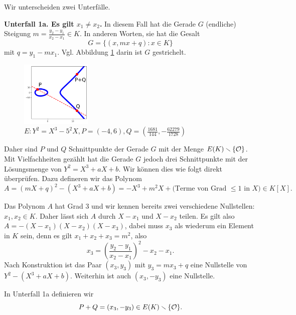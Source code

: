 Wir unterscheiden zwei Unterfälle. 

\textbf{Unterfall 1a. Es gilt $x_1\not=x_2$.} In diesem Fall hat die
Gerade $G$ (endliche) Steigung $m = \frac{y_2-y_1}{x_2-x_1}\in K$. In
anderen Worten, sie hat die Gesalt
\begin{equation*}
  G = \{(x,mx+q) : x\in K \}
\end{equation*}
mit $q=y_1-m x_1$. Vgl. Abbildung \ref{fig:unterfall1a} darin ist $G$
gestrichelt.

\begin{figure}
  \centering    
  \caption{$E: Y^2 = X^3-5^2 X,P = (-4,6),Q = (\frac{1681}{144},-\frac{62279}{1728})$}
  \label{fig:unterfall1a}
  \includegraphics[width=0.3\textwidth]{./plots/unterfall1a.png}
\end{figure}
 
Daher sind $P$ und $Q$ Schnittpunkte der Gerade $G$ mit der Menge
$E(K)\smallsetminus \{{\mathcal O}\}$. Mit Vielfachheiten gezählt hat die Gerade $G$
jedoch drei Schnittpunkte mit der Lösungsmenge von $Y^2=X^3+aX+b$. Wir
können dies wie folgt direkt überprüfen. Dazu defineren wir
das Polynom
\begin{equation*}
  A = (mX+q)^2 - (X^3+aX+b) =-X^3+m^2X +\text{(Terme von Grad $\le 1$ in $X$)}
  \in K[X]. 
\end{equation*}

Das Polynom $A$ hat Grad $3$  und wir kennen bereits zwei verschiedene
Nullstellen: $x_1,x_2\in K$. Daher lässt sich $A$ durch $X-x_1$ und
$X-x_2$ teilen. Es gilt also $A = -(X-x_1)(X-x_2)(X-x_3)$, dabei muss
$x_3$ als wiederum ein Element in $K$ sein, denn es gilt $x_1+x_2+x_3
= m^2$, also
\begin{equation*}
  x_3 = \left(\frac{y_2-y_1}{x_2-x_1}\right)^2-x_2-x_1.
\end{equation*}
Nach Konstruktion ist das Paar $(x_3,y_3)$ mit  $y_3=mx_3+q$ eine
Nullstelle von $Y^2-(X^3+aX+b)$. Weiterhin ist auch $(x_3,-y_3)$ eine
Nullstelle.

In Unterfall 1a definieren wir
\begin{equation*}
  P+Q = (x_3,-y_3) \in E(K)\smallsetminus \{{\mathcal O}\}.
\end{equation*}


